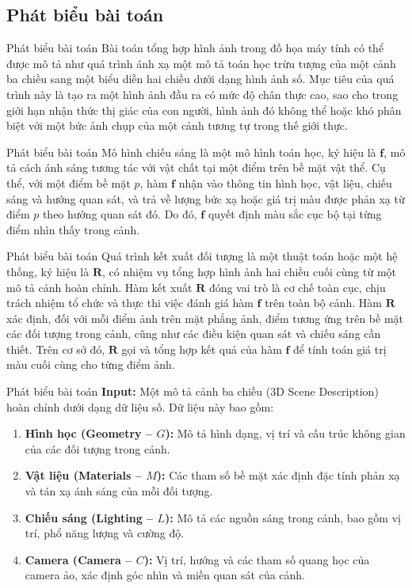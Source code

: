 \documentclass[11pt, aspectratio=169]{beamer}
\begin{document}
\subsection{Phát biểu bài toán}
\begin{frame}{Phát biểu bài toán}
	Bài toán tổng hợp hình ảnh trong đồ họa máy tính có thể được mô tả như quá trình ánh xạ một mô tả toán học trừu tượng của một cảnh ba chiều sang một biểu diễn hai chiều dưới dạng hình ảnh số. Mục tiêu của quá trình này là tạo ra một hình ảnh đầu ra có mức độ chân thực cao, sao cho trong giới hạn nhận thức thị giác của con người, hình ảnh đó không thể hoặc khó phân biệt với một bức ảnh chụp của một cảnh tương tự trong thế giới thực.
\end{frame}

\begin{frame}{Phát biểu bài toán}
	Mô hình chiếu sáng là một mô hình toán học, ký hiệu là $\textbf{f}$, mô tả cách ánh sáng tương tác với vật chất tại một điểm trên bề mặt vật thể. Cụ thể, với một điểm bề mặt $p$, hàm $\textbf{f}$ nhận vào thông tin hình học, vật liệu, chiếu sáng và hướng quan sát, và trả về lượng bức xạ hoặc giá trị màu được phản xạ từ điểm $p$ theo hướng quan sát đó. Do đó, $\textbf{f}$ quyết định màu sắc cục bộ tại từng điểm nhìn thấy trong cảnh.
\end{frame}

\begin{frame}{Phát biểu bài toán}
	Quá trình kết xuất đối tượng là một thuật toán hoặc một hệ thống, ký hiệu là $\textbf{R}$, có nhiệm vụ tổng hợp hình ảnh hai chiều cuối cùng từ một mô tả cảnh hoàn chỉnh. Hàm kết xuất $\textbf{R}$ đóng vai trò là cơ chế toàn cục, chịu trách nhiệm tổ chức và thực thi việc đánh giá hàm $\textbf{f}$ trên toàn bộ cảnh. Hàm $\textbf{R}$ xác định, đối với mỗi điểm ảnh trên mặt phẳng ảnh, điểm tương ứng trên bề mặt các đối tượng trong cảnh, cũng như các điều kiện quan sát và chiếu sáng cần thiết. Trên cơ sở đó, $\textbf{R}$ gọi và tổng hợp kết quả của hàm $\textbf{f}$ để tính toán giá trị màu cuối cùng cho từng điểm ảnh.
\end{frame}


\begin{frame}{Phát biểu bài toán}
	\textbf{Input:} Một mô tả cảnh ba chiều (3D Scene Description) hoàn chỉnh dưới dạng dữ liệu số. Dữ liệu này bao gồm:
	\begin{enumerate}
		\item \textbf{Hình học (Geometry -- $G$):} Mô tả hình dạng, vị trí và cấu trúc không gian của các đối tượng trong cảnh.
		\item \textbf{Vật liệu (Materials -- $M$):} Các tham số bề mặt xác định đặc tính phản xạ và tán xạ ánh sáng của mỗi đối tượng.
		\item \textbf{Chiếu sáng (Lighting -- $L$):} Mô tả các nguồn sáng trong cảnh, bao gồm vị trí, phổ năng lượng và cường độ.
		\item \textbf{Camera (Camera -- $C$):} Vị trí, hướng và các tham số quang học của camera ảo, xác định góc nhìn và miền quan sát của cảnh.
	\end{enumerate}
\end{frame}
\end{document}
